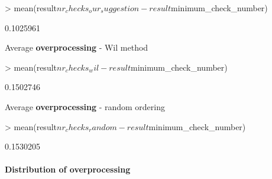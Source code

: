\documentclass{article}
\begin{document}
\begin{Schunk}
\begin{Sinput}
> mean(result$nr_checks_our_suggestion - result$minimum_check_number)
\end{Sinput}
\begin{Soutput}
[1] 0.1025961
\end{Soutput}
\end{Schunk}

Average \textbf{overprocessing} - Wil method

\begin{Schunk}
\begin{Sinput}
> mean(result$nr_checks_wil - result$minimum_check_number)
\end{Sinput}
\begin{Soutput}
[1] 0.1502746
\end{Soutput}
\end{Schunk}

Average \textbf{overprocessing} - random ordering

\begin{Schunk}
\begin{Sinput}
> mean(result$nr_checks_random - result$minimum_check_number)
\end{Sinput}
\begin{Soutput}
[1] 0.1530205
\end{Soutput}
\end{Schunk}

\paragraph{Distribution of overprocessing}
\end{document}
